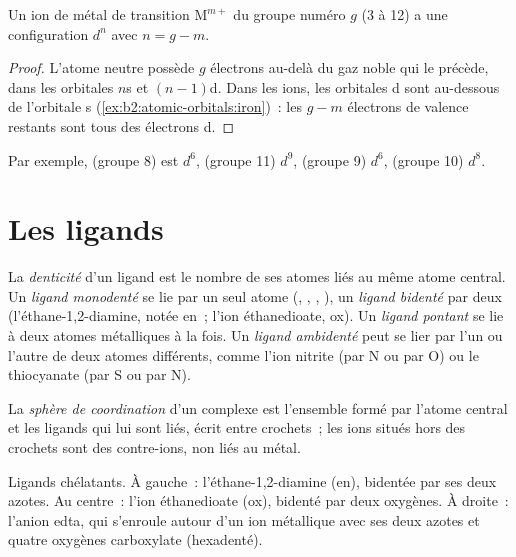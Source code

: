 \begin{proposition}\label{prop:b2:coordination-complexes:dn}
Un ion de métal de transition $\mathrm M^{m+}$ du groupe numéro $g$ (3 à 12) a une configuration $d^n$
avec $n = g - m$.
\end{proposition}

\begin{proof}
L'atome neutre possède $g$ électrons au-delà du gaz noble qui le précède, dans les orbitales $n$s et
$(n - 1)$d. Dans les ions, les orbitales d sont au-dessous de l'orbitale s
(\cref{ex:b2:atomic-orbitals:iron})~: les $g - m$ électrons de valence restants sont tous des électrons
d.
\end{proof}

Par exemple,  (groupe 8) est $d^6$,  (groupe 11) $d^9$,  (groupe 9)
$d^6$,  (groupe 10) $d^8$.

\section{Les ligands}

\begin{definition}[Denticité]\label{def:b2:coordination-complexes:denticity}
La \emph{denticité} d'un ligand est le nombre de ses atomes liés au
même atome central. Un \emph{ligand monodenté} se lie
par un seul atome (, , , ), un \emph{ligand
bidenté} par deux (l'éthane-1,2-diamine, notée en~; l'ion
éthanedioate, ox). Un \emph{ligand pontant} se lie à deux
atomes métalliques à la fois. Un \emph{ligand ambidenté} peut se lier
par l'un ou l'autre de deux atomes différents, comme l'ion nitrite (par N ou par O) ou
le thiocyanate (par S ou par N).
\end{definition}

\begin{definition}\label{def:b2:coordination-complexes:coordination-sphere}
La \emph{sphère de coordination} d'un complexe est l'ensemble formé par
l'atome central et les ligands qui lui sont liés, écrit entre crochets~; les ions
situés hors des crochets sont des contre-ions, non liés au métal.
\end{definition}

\begin{omfigure}
\qquad
{}
\qquad
{}

\medskip
{\small Ligands chélatants. À gauche~: l'éthane-1,2-diamine (en), bidentée par ses deux
azotes. Au centre~: l'ion éthanedioate (ox), bidenté par deux oxygènes. À droite~:
l'anion edta, qui s'enroule autour d'un ion métallique avec ses deux azotes et quatre
oxygènes carboxylate (hexadenté).}
\end{omfigure}

